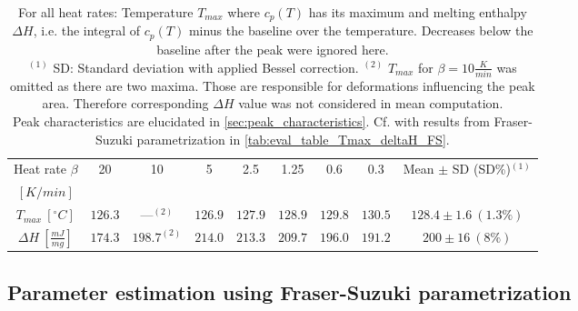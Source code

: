 \documentclass{scrartcl}[12pt, halfparskip]
\numberwithin{equation}{section}
\numberwithin{figure}{section}
\numberwithin{table}{section}
\begin{document}
\begin{table}[H]
	\centering
	\caption{For all heat rates: Temperature $T_{max}$ where $c_p(T)$ has its maximum and melting enthalpy $\Delta H$, i.e. the integral of $c_p(T)$ minus the baseline over the temperature. Decreases below the baseline after the peak were ignored here. \\
		$^{(1)}$ SD: Standard deviation with applied Bessel correction. 
		$^{(2)}$ $T_{max}$ for $\beta=10\frac{K}{min}$ was omitted as there are two maxima. Those are responsible for deformations influencing the peak area. Therefore corresponding $\Delta H$ value was not considered in mean computation. \\
		Peak characteristics are elucidated in \cref{sec:peak_characteristics}. Cf. with results from Fraser-Suzuki parametrization in \cref{tab:eval_table_Tmax_deltaH_FS}.}
	\begin{tabular}{| c | c | c | c | c | c | c | c || c |} \hline
		Heat rate $\beta$ & 20 & 10 & 5 & 2.5 & 1.25 & 0.6 & 0.3 & Mean $\pm$ SD (SD\%)$^{(1)}$ \\
		$[K/min]$ & & & & & & & & \\ \hline
		$T_{max} \ [^{\circ}C]$ & $126.3$ & ---$^{(2)}$ & $126.9$ & $127.9$ & $128.9$ & $129.8$ & $130.5$ & $128.4 \pm 1.6 \ (1.3\%)$ \\[0.7ex]
		$\Delta H \ [\frac{mJ}{mg}]$ & $174.3$ & $198.7^{(2)}$ & $214.0$ & $213.3$ & $209.7$ & $196.0$ & $191.2$ & $200 \pm 16 \ (8\%)$ \\ \hline
	\end{tabular}
	\label{tab:eval_table_Tmax_deltaH_5Gaussians}
\end{table}


\subsection{Parameter estimation using Fraser-Suzuki parametrization}
\label{sec:param_estimation_fs}
\end{document}
